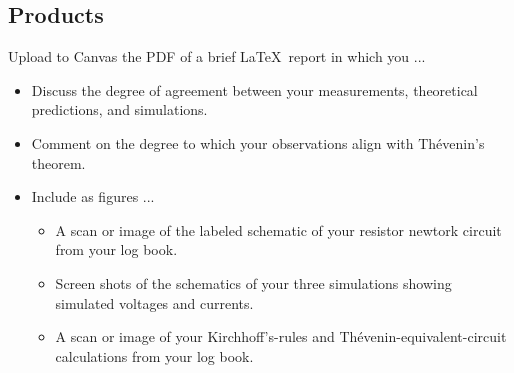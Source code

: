\documentclass[11pt]{article}
\begin{document}
\subsection*{Products}

Upload to Canvas the PDF of a brief \LaTeX\ report in which you ...
\begin{itemize}
\item  Discuss the degree of agreement between your measurements,
  theoretical predictions, and simulations.

\item Comment on the degree to which your observations align with
  Th\'{e}venin's theorem.

\item Include as figures ...
  \begin{itemize}
  \item A scan or image of the labeled schematic of your resistor
    newtork circuit from your log book.

  \item Screen shots of the schematics of your three simulations
    showing simulated voltages and currents.

  \item A scan or image of your Kirchhoff's-rules and
    Th\'{e}venin-equivalent-circuit calculations from your log book.
  \end{itemize}
\end{itemize}
\end{document}
